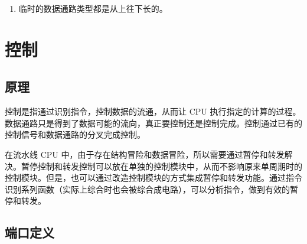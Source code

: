 \documentclass[12pt,AutoFakeBold,AutoFakeSlant]{article}
\providecommand{\tightlist}{%
  \setlength{\itemsep}{0pt}\setlength{\parskip}{0pt}}
\begin{document}
\begin{enumerate}
\def\labelenumi{\arabic{enumi}.}
\tightlist
\item
  临时的数据通路类型都是从上往下长的。
\end{enumerate}

\hypertarget{ux63a7ux5236}{%
\section{控制}\label{ux63a7ux5236}}

\hypertarget{ux539fux7406-11}{%
\subsection{原理}\label{ux539fux7406-11}}

控制是指通过识别指令，控制数据的流通，从而让 CPU
执行指定的计算的过程。数据通路只是得到了数据可能的流向，真正要控制还是控制完成。控制通过已有的控制信号和数据通路的分叉完成控制。

在流水线 CPU
中，由于存在结构冒险和数据冒险，所以需要通过暂停和转发解决。暂停控制和转发控制可以放在单独的控制模块中，从而不影响原来单周期时的控制模块。但是，也可以通过改造控制模块的方式集成暂停和转发功能。通过指令识别系列函数（实际上综合时也会被综合成电路），可以分析指令，做到有效的暂停和转发。

\hypertarget{ux7aefux53e3ux5b9aux4e49-9}{%
\subsection{端口定义}\label{ux7aefux53e3ux5b9aux4e49-9}}
\end{document}
